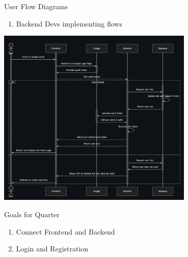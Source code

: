 

\begin{frame}{User Flow Diagrams}
    \centering
    
    \begin{enumerate}
        \item Backend Devs implementing flows
    \end{enumerate}
    \includegraphics[height=0.7\textheight,width=0.7\textwidth,keepaspectratio]{images/fs_user/login_flow.png}
    \newline
    
\end{frame}

\begin{frame}{Goals for Quarter}
    \begin{enumerate}
        \item Connect Frontend and Backend
        \item Login and Registration
    \end{enumerate}
\end{frame}

